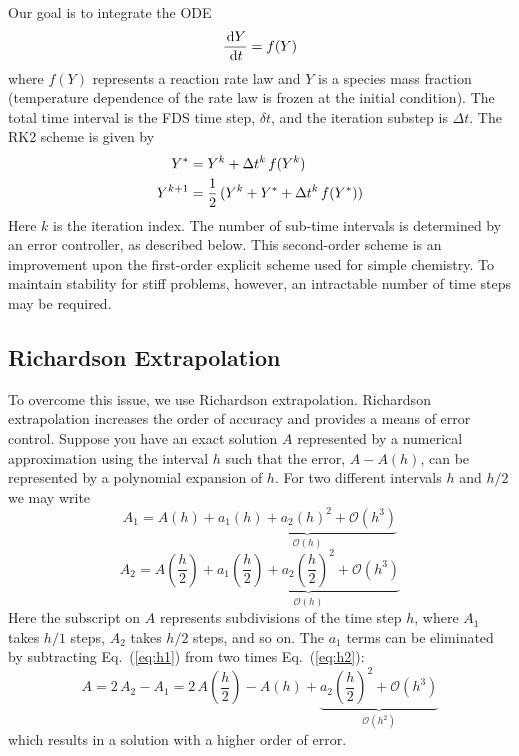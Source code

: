 Our goal is to integrate the ODE
\begin{equation}
\frac{\,\mathrm{d} Y}{\,\mathrm{d} t} = f(Y)
\end{equation}
where $f(Y)$ represents a reaction rate law and $Y$ is a species mass fraction (temperature dependence of the rate law is frozen at the initial condition).  The total time interval is the FDS time step, $\delta t$, and the iteration substep is $\Delta t$. The RK2 scheme is given by
\begin{align}
\label{RK2}
Y^* &= Y^k + \Delta t^k \, f(Y^k) \notag\\
Y^{k+1}   &= \frac{1}{2}\,(Y^k + Y^* + \Delta t^k \, f(Y^*))
\end{align}
Here $k$ is the iteration index.  The number of sub-time intervals is determined by an error controller, as described below. This second-order scheme is an improvement upon the first-order explicit scheme used for simple chemistry. To maintain stability for stiff problems, however, an intractable number of time steps may be required.

\subsection*{Richardson Extrapolation}

To overcome this issue, we use Richardson extrapolation. Richardson extrapolation increases the order of accuracy and provides a means of error control. Suppose you have an exact solution $A$ represented by a numerical approximation using the interval $h$ such that the error, $A-A(h)$, can be represented by a polynomial expansion of $h$. For
two different intervals $h$ and $h/2$ we may write
\begin{equation}\label{eq:h1}
A_1={A(h)} + \underbrace{a_{1}(h) + a_{2}(h)^2 + \mathcal{O}(h^3)}_{\mathcal{O}(h)}
\end{equation}
\begin{equation}\label{eq:h2}
A_2=A\left(\frac{h}{2}\right) + \underbrace{a_{1}\left(\frac{h}{2}\right) + a_{2}\left(\frac{h}{2}\right)^2 + \mathcal{O}(h^3)}_{\mathcal{O}(h)}
\end{equation}
Here the subscript on $A$ represents subdivisions of the time step $h$, where $A_1$ takes $h/1$ steps, $A_2$ takes $h/2$ steps, and so on. The $a_{1}$ terms can be eliminated by subtracting Eq.~(\ref{eq:h1}) from two times Eq.~(\ref{eq:h2}):
\begin{equation}\label{eq:A2}
A=2\,A_2-A_1 = 2\,A\left(\frac{h}{2}\right) - A(h) + \underbrace{a_{2}\left(\frac{h}{2}\right)^2 + \mathcal{O}(h^3)}_{\mathcal{O}(h^2)}
\end{equation}
which results in a solution with a higher order of error.

